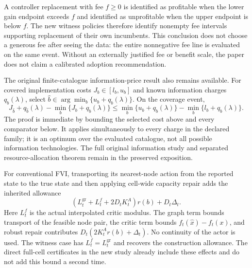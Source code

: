 A controller replacement with fee $f\ge0$ is identified as profitable when the lower gain endpoint exceeds $f$ and identified as unprofitable when the upper endpoint is below $f$. The new witness policies therefore identify nonempty fee intervals supporting replacement of their own incumbents. This conclusion does not choose a generous fee after seeing the data: the entire nonnegative fee line is evaluated on the same event. Without an externally justified fee or benefit scale, the paper does not claim a calibrated adoption recommendation.

The original finite-catalogue information-price result also remains available. For covered implementation costs $J_b\in[l_b,u_b]$ and known information charges $q_b(\lambda)$, select $\widehat b\in\arg\min_b\{u_b+q_b(\lambda)\}$. On the coverage event,
\[
 J_{\widehat b}+q_{\widehat b}(\lambda)-\min_b\{J_b+q_b(\lambda)\}
 \le\min_b\{u_b+q_b(\lambda)\}-\min_b\{l_b+q_b(\lambda)\}.
\]
The proof is immediate by bounding the selected cost above and every comparator below. It applies simultaneously to every charge in the declared family; it is an optimum over the evaluated catalogue, not all possible information technologies. The full original information study and separated resource-allocation theorem remain in the preserved exposition.

For conventional FVI, transporting its nearest-node action from the reported state to the true state and then applying cell-wide capacity repair adds the inherited allowance
\begin{equation}\label{eq:fvisensor53}
 (L_t^{\mathrm{gr}}+L_t^f+2D_tK_t^A)r(b)+D_t\Delta_t.
\end{equation}
Here $L_t^f$ is the actual interpolated critic modulus. The graph term bounds transport of the feasible node pair, the critic term bounds $f_t(\widehat x)-f_t(x)$, and robust repair contributes $D_t(2K_t^Ar(b)+\Delta_t)$. No continuity of the actor is used. The witness case has $L_t^f=L_t^{\mathrm{gr}}$ and recovers the construction allowance. The direct full-cell certificates in the new study already include these effects and do not add this bound a second time.
